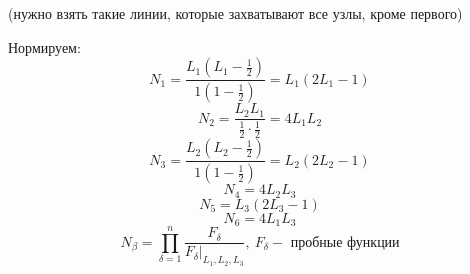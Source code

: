 (нужно взять такие линии, которые захватывают все узлы, кроме первого)

Нормируем:
\[N_1 = \frac{L_1 \left(L_1 - \displaystyle\frac{1}{2}\right)}{1 \left(1 - \displaystyle\frac{1}{2}\right)} = L_1 (2L_1 - 1)\]
\[N_2 = \frac{L_2L_1}{\displaystyle\frac{1}{2} \cdot \frac{1}{2}} = 4L_1L_2\]
\[N_3 = \frac{L_2 \left(L_2 - \displaystyle\frac{1}{2}\right)}{1 \left(1 - \displaystyle\frac{1}{2}\right)} = L_2 (2L_2 - 1)\]
\[N_4 = 4L_2L_3\]
\[N_5 = L_3(2L_3 - 1)\]
\[N_6 = 4L_1L_3\]
\[N_{\beta} = \prod_{\delta=1}^n \frac{F_{\delta}}{F_{\delta} |_{L_1,L_2,L_3}},\ F_{\delta} - \text{ пробные функции}\]
